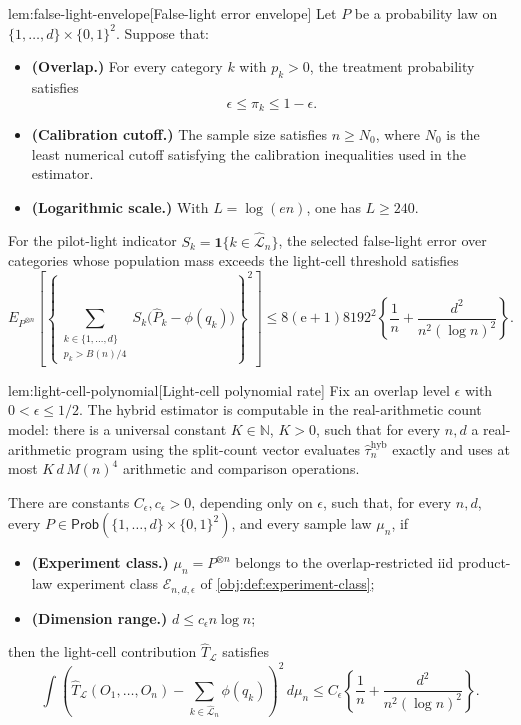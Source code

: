 \begin{lemmav}{lem:false-light-envelope}[False-light error envelope]
Let \(P\) be a probability law on \(\{1,\ldots,d\}\times\{0,1\}^2\). Suppose that:
\begin{itemize}
\item \textbf{(Overlap.)} For every category \(k\) with \(p_k>0\), the treatment probability satisfies
\[
\epsilon \le \pi_k \le 1-\epsilon .
\]
\item \textbf{(Calibration cutoff.)} The sample size satisfies \(n\ge N_0\), where \(N_0\) is the least numerical cutoff satisfying the calibration inequalities used in the estimator.
\item \textbf{(Logarithmic scale.)} With \(L=\log(en)\), one has \(L\ge 240\).
\end{itemize}
For the pilot-light indicator \(S_k=\mathbf 1\{k\in\widehat{\mathcal L}_n\}\), the selected false-light error over categories whose population mass exceeds the light-cell threshold satisfies
\[
E_{P^{\otimes n}}\left[
\left\{
\sum_{\substack{k\in\{1,\ldots,d\}\\ p_k>B(n)/4}}
S_k\bigl(\widehat P_k-\phi(q_k)\bigr)
\right\}^2
\right]
\le
8(\mathrm e+1)8192^2
\left\{
\frac1n+\frac{d^2}{n^2(\log n)^2}
\right\}.
\]
\end{lemmav}

\begin{lemmav}{lem:light-cell-polynomial}[Light-cell polynomial rate]
Fix an overlap level \(\epsilon\) with \(0<\epsilon\le 1/2\). The hybrid estimator is computable in the real-arithmetic count model: there is a universal constant \(K\in\mathbb N\), \(K>0\), such that for every \(n,d\) a real-arithmetic program using the split-count vector evaluates \(\widehat\tau_n^{\mathrm{hyb}}\) exactly and uses at most \(K\,d\,M(n)^4\) arithmetic and comparison operations.

There are constants \(C_\epsilon,c_\epsilon>0\), depending only on \(\epsilon\), such that, for every \(n,d\), every \(P\in\mathsf{Prob}(\{1,\ldots,d\}\times\{0,1\}^2)\), and every sample law \(\mu_n\), if
\begin{itemize}
\item \textbf{(Experiment class.)} \(\mu_n=P^{\otimes n}\) belongs to the overlap-restricted iid product-law experiment class \(\mathcal E_{n,d,\epsilon}\) of \cref{obj:def:experiment-class};
\item \textbf{(Dimension range.)} \(d\le c_\epsilon n\log n\);
\end{itemize}
then the light-cell contribution \(\widehat T_{\mathcal L}\) satisfies
\[
\int\left(\widehat T_{\mathcal L}(O_1,\ldots,O_n)
-\sum_{k\in\widehat{\mathcal L}_n}\phi(q_k)\right)^2\,d\mu_n
\le
C_\epsilon\left\{\frac1n+\frac{d^2}{n^2(\log n)^2}\right\}.
\]
\end{lemmav}
